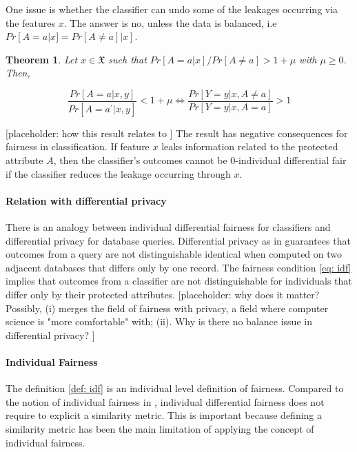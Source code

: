 \documentclass{article}
\newtheorem{thm}{Theorem}[section]
\begin{document}
\bigskip
One issue is whether the classifier can undo some of the leakages occurring via the features $x$.  The answer is no, unless the data is balanced, i.e $Pr[A=a|x] = Pr[A\neq a]| x]$. 

\begin{thm}
Let $x\in \mathfrak{X}$ such that $Pr[A=a|x] /Pr[A\neq a] > 1 + \mu$ with $\mu \geq 0$. Then,

\begin{equation}
 \frac{Pr[A=a|x, y]}{Pr[A=a^{'}|x, y]} < 1 + \mu \iff \frac{Pr[Y=y|x, A\neq a]}{Pr[Y=y|x, A=a]} > 1
 \end{equation}
\end{thm}

[placeholder: how this result relates to \cite{kleinberg2016inherent}] The result has negative consequences for fairness in classification. If feature $x$ leaks information related to the protected attribute $A$, then the classifier's outcomes cannot be $0$-individual differential fair if the classifier reduces the leakage occurring through $x$. 

\paragraph{Relation with differential privacy}
There is an analogy between individual differential fairness for classifiers and differential privacy for database queries. Differential privacy as in  \cite{dwork2014algorithmic} guarantees that outcomes from a query are not distinguishable identical when computed on two adjacent databases that differs only by one record. The fairness condition \eqref{eq: idf} implies that outcomes from a classifier are not distinguishable for individuals that differ only by their protected attributes. [placeholder: why does it matter? Possibly, (i) merges the field of fairness with privacy, a field where computer science is "more comfortable" with; (ii). Why is there no balance issue in differential privacy? ] 

\paragraph{Individual Fairness}
The definition \ref{def: idf} is an individual level definition of fairness. Compared to the notion of individual fairness in \cite{dwork2012fairness}, individual differential fairness does not require to explicit a similarity metric. This is important because defining a similarity metric has been the main limitation of applying the concept of individual fairness.
\end{document}
